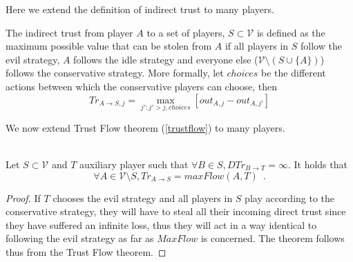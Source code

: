 \documentclass[11pt]{llncs}
\theoremstyle{definition}
\begin{document}
     Here we extend the definition of indirect trust to many players.
     \begin{definition}
        The indirect trust from player $A$ to a set of players, $S \subset \mathcal{V}$ is defined as the maximum possible
        value that can be stolen from $A$ if all players in $S$ follow the evil strategy, $A$ follows the idle strategy and
        everyone else ($\mathcal{V} \setminus \left(S \cup \{A\}\right)$) follows the conservative strategy.
        More formally, let $choices$ be the different actions between which the conservative players can choose, then
        \begin{equation}
           Tr_{A \rightarrow S, j} = \max\limits_{j' : j' > j, choices}{\left[out_{A,j} - out_{A,j'}\right]}
        \end{equation}
     \end{definition}
     We now extend Trust Flow theorem (\ref{trustflow}) to many players.
     \begin{theorem} \ \\
        \label{trustmany}
        Let $S \subset \mathcal{V}$ and $T$ auxiliary player such that $\forall B \in S, DTr_{B \rightarrow T} = \infty$.
        It holds that
        \begin{equation*}
           \forall A \in \mathcal{V} \setminus S, Tr_{A \rightarrow S} = maxFlow\left(A, T\right) \enspace.
        \end{equation*}
     \end{theorem}       
     \begin{proof}
        If $T$ chooses the evil strategy and all players in $S$ play according to the conservative strategy, they will have
        to steal all their incoming direct trust since they have suffered an infinite loss, thus they will act in a way
        identical to following the evil strategy as far as $MaxFlow$ is concerned. The theorem follows thus from the Trust
        Flow theorem.
     \end{proof}
\end{document}
